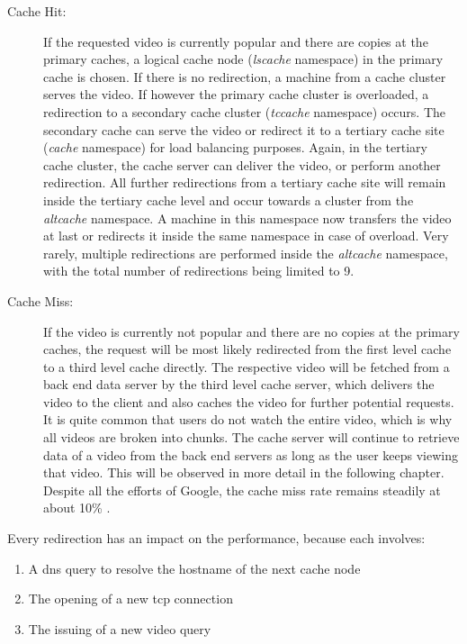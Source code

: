 \begin{description}
\item[Cache Hit:] If the requested video is currently popular and there are copies at the primary caches, a logical cache node (\emph{lscache} namespace) in the primary cache is chosen. If there is no redirection, a machine from a cache cluster serves the video. If however the primary cache cluster is overloaded, a redirection to a secondary cache cluster (\emph{tccache} namespace) occurs. The secondary cache can serve the video or redirect it to a tertiary cache site (\emph{cache} namespace) for load balancing purposes. Again, in the tertiary cache cluster, the cache server can deliver the video, or perform another redirection. All further redirections from a tertiary cache site will remain inside the tertiary cache level and occur towards a cluster from the \emph{altcache} namespace. A machine in this namespace now transfers the video at last or redirects it inside the same namespace in case of overload. Very rarely, multiple redirections are performed inside the \emph{altcache} namespace, with the total number of redirections being limited to 9. 

\item[Cache Miss:] If the video is currently not popular and there are no copies at the primary caches, the request will be most likely redirected from the first level cache to a third level cache directly. The respective video will be fetched from a back end data server by the third level cache server, which delivers the video to the client and also caches the video for further potential requests. It is quite common that users do not watch the entire video, which is why all videos are broken into chunks. The cache server will continue to retrieve data of a video from the back end servers as long as the user keeps viewing that video. This will be observed in more detail in the following chapter. \\
  Despite all the efforts of Google, the cache miss rate remains steadily at about 10\% \cite{inc:video_delivery}.
\end{description}

Every redirection has an impact on the performance, because each involves:

\begin{enumerate}
  \item A \gls{dns} query to resolve the hostname of the next cache node
  \item The opening of a new \gls{tcp} connection
  \item The issuing of a new video query
\end{enumerate}


